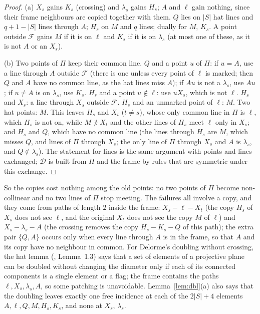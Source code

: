 \documentclass[11pt]{amsart}
\theoremstyle{definition}
\theoremstyle{remark}
\newcommand{\cD}{\mathcal{D}}
\newcommand{\cF}{\mathcal{F}}
\newcommand{\lam}{\lambda}
\begin{document}
\begin{proof}
(a) $X_s$ gains $K_s$ (crossing) and $\lam_s$ gains $H_s$; $A$ and $\ell$ gain nothing, since their frame neighbours are copied together with them. $Q$ lies on $|S|$ hat lines and $q+1-|S|$ lines through $A$; $H_s$ on $M$ and $q$ lines; dually for $M$, $K_s$. A point outside $\cF$ gains $M$ if it is on $\ell$ and $K_s$ if it is on $\lam_s$ (at most one of these, as it is not $A$ or an $X_s$).

(b) Two points of $\Pi$ keep their common line. $Q$ and a point $u$ of $\Pi$: if $u=A$, use a line through $A$ outside $\cF$ (there is one unless every point of $\ell$ is marked; then $Q$ and $A$ have no common line, as the hat lines miss $A$); if $Au$ is not a $\lam_s$, use $Au$; if $u\neq A$ is on $\lam_s$, use $K_s$. $H_s$ and a point $u\notin\ell$: use $uX_s$, which is not $\ell$. $H_s$ and $X_s$: a line through $X_s$ outside $\cF$. $H_s$ and an unmarked point of $\ell$: $M$. Two hat points: $M$. This leaves $H_s$ and $X_t$ ($t\ne s$), whose only common line in $\Pi$ is $\ell$, which $H_s$ is not on, while $M\not\ni X_t$ and the other lines of $H_s$ meet $\ell$ only in $X_s$; and $H_s$ and $Q$, which have no common line (the lines through $H_s$ are $M$, which misses $Q$, and lines of $\Pi$ through $X_s$; the only line of $\Pi$ through $X_s$ and $A$ is $\lam_s$, and $Q\notin\lam_s$). The statement for lines is the same argument with points and lines exchanged; $\cD$ is built from $\Pi$ and the frame by rules that are symmetric under this exchange.
\end{proof}

So the copies cost nothing among the old points: no two points of $\Pi$ become non-collinear and no two lines of $\Pi$ stop meeting. The failures all involve a copy, and they come from paths of length $2$ inside the frame: $X_s-\ell-X_t$ (the copy $H_s$ of $X_s$ does not see $\ell$, and the original $X_t$ does not see the copy $M$ of $\ell$) and $X_s-\lam_s-A$ (the crossing removes the copy $H_s-K_s-Q$ of this path); the extra pair $\{Q,A\}$ occurs only when every line through $A$ is in the frame, so that $A$ and its copy have no neighbour in common. For Delorme's doubling without crossing, the hat lemma (, Lemma~1.3) says that a set of elements of a projective plane can be doubled without changing the diameter only if each of its connected components is a single element or a flag; the frame contains the paths $\ell,X_s,\lam_s,A$, so some patching is unavoidable. Lemma~\ref{lem:dbl}(a) also says that the doubling leaves exactly one free incidence at each of the $2|S|+4$ elements $A,\ell,Q,M,H_s,K_s$, and none at $X_s$, $\lam_s$.
\end{document}
